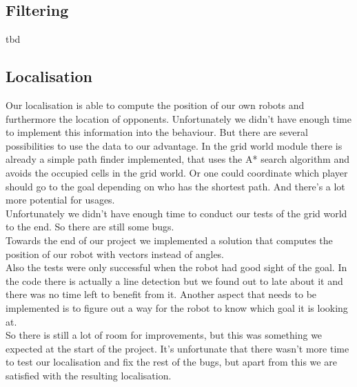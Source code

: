 \documentclass[lnicst,a4paper]{svmultln}
\begin{document}
\subsection{Filtering}
tbd

\subsection{Localisation}
Our localisation is able to compute the position of our own robots and furthermore the location of opponents. Unfortunately we didn't have enough time to implement this information into the behaviour. But there are several possibilities to use the data to our advantage. In the grid world module there is already a simple path finder implemented, that uses the A* search algorithm and avoids the occupied cells in the grid world. Or one could coordinate which player should go to the goal depending on who has the shortest path. And there's a lot more potential for usages.
\\
Unfortunately we didn't have enough time to conduct our tests of the grid world to the end. So there are still some bugs. 
\\
Towards the end of our project we implemented a solution that computes the position of our robot with vectors instead of angles.
\\
Also the tests were only successful when the robot had good sight of the goal. In the code there is actually a line detection but we found out to late about it and there was no time left to benefit from it. Another aspect that needs to be implemented is to figure out a way for the robot to know which goal it is looking at.
\\
So there is still a lot of room for improvements, but this was something we expected at the start of the project. It's unfortunate that there wasn't more time to test our localisation and fix the rest of the bugs, but apart from this we are satisfied with the resulting localisation.
\end{document}
